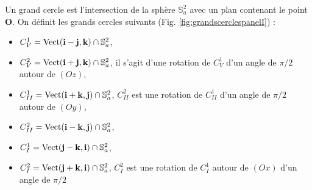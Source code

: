 Un grand cercle est l'intersection de la sphère $\mathbb{S}_a^2$ avec un plan contenant le point $\mathbf{O}$. On définit les grands cercles suivants (Fig. \ref{fig:grandscerclespanelI}) :

\begin{itemize}
\item $C_V^1 = \text{Vect}(\mathbf{i}-\mathbf{j}, \mathbf{k}) \cap \mathbb{S}_a^2$,
\item $C_V^2 = \text{Vect}(\mathbf{i}+\mathbf{j}, \mathbf{k}) \cap \mathbb{S}_a^2$, il s'agit d'une rotation de $C_V^1$ d'un angle de $\pi/2$ autour de $(Oz)$,
\item $C_{II}^1 = \text{Vect}(\mathbf{i}+\mathbf{k}, \mathbf{j}) \cap \mathbb{S}_a^2$, $C_{II}^2$ est une rotation de $C_{II}^1$ d'un angle de $\pi/2$ autour de $(Oy)$,
\item $C_{II}^2 = \text{Vect}(\mathbf{i}-\mathbf{k}, \mathbf{j}) \cap \mathbb{S}_a^2$,
\item $C_I^1=\text{Vect}(\mathbf{j}-\mathbf{k},\mathbf{i}) \cap \mathbb{S}_a^2$,
\item $C_I^2=\text{Vect}(\mathbf{j}+\mathbf{k},\mathbf{i}) \cap \mathbb{S}_a^2$, $C_I^2$ est une rotation de $C_I^1$ autour de $(Ox)$ d'un angle de $\pi/2$
\end{itemize}

